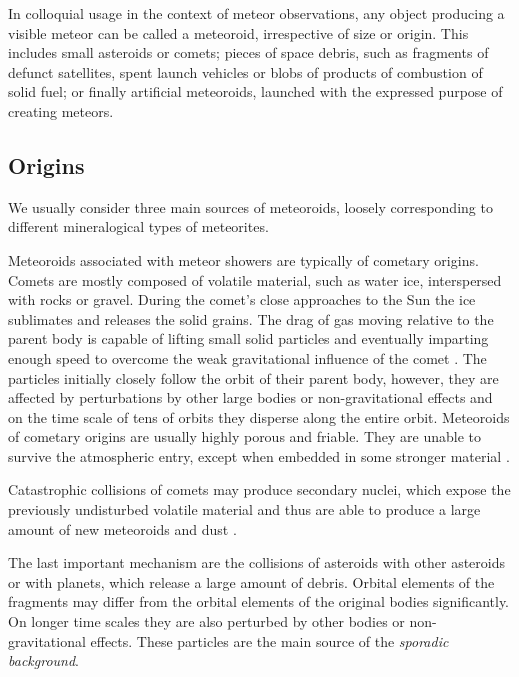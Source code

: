         In colloquial usage in the context of meteor observations, any object producing a visible meteor can be called a meteoroid,
        irrespective of size or origin. This includes small asteroids or comets; pieces of space debris,
        such as fragments of defunct satellites, spent launch vehicles or blobs of products of combustion of solid fuel;
        or finally artificial meteoroids, launched with the expressed purpose of creating meteors.

        \subsection{Origins} \label{iamo}
            We usually consider three main sources of meteoroids, loosely corresponding to different
            mineralogical types of meteorites.

            Meteoroids associated with meteor showers are typically of cometary origins.
            Comets are mostly composed of volatile material, such as water ice, interspersed
            with rocks or gravel. During the comet's close approaches to the Sun the ice sublimates
            and releases the solid grains. The drag of gas moving relative to the parent body
            is capable of lifting small solid particles and eventually imparting enough speed
            to overcome the weak gravitational influence of the comet \citep{whipple1951}.
            The particles initially closely follow the orbit of their parent body,
            however, they are affected by perturbations by other large bodies or non-gravitational effects
            and on the time scale of tens of orbits they disperse along the entire orbit.
            Meteoroids of cometary origins are usually highly porous and friable.
            They are unable to survive the atmospheric entry, except when embedded in some stronger material \citep{nittler+2019}.

            Catastrophic collisions of comets may produce secondary nuclei, which expose
            the previously undisturbed volatile material and thus are able to produce
            a large amount of new meteoroids and dust \citep{jenniskens2006}.

            The last important mechanism are the collisions of asteroids with other asteroids
            or with planets, which release a large amount of debris. Orbital elements of the fragments
            may differ from the orbital elements of the original bodies significantly.
            On longer time scales they are also perturbed by other bodies or non-gravitational effects.
            These particles are the main source of the \emph{sporadic background}.

